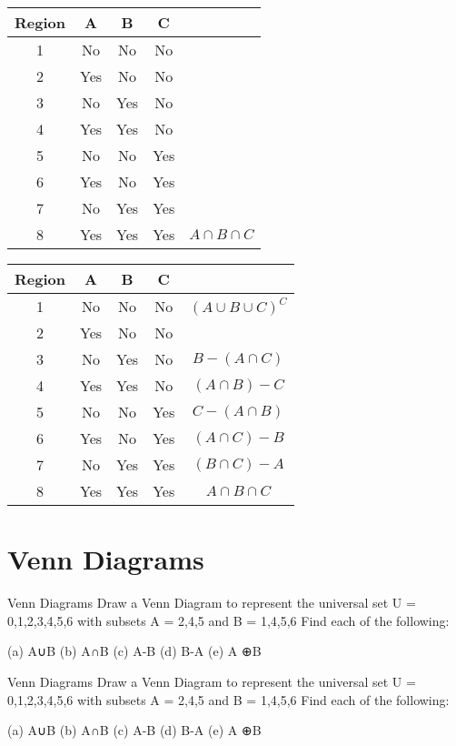 \begin{center}
	\begin{tabular}{|c|c|c|c|c|}
		\hline Region & A & B & C &  \\ 
		\hline 1 &\phantom{sp} No \phantom{sp}&\phantom{sp} No\phantom{sp} & \phantom{sp} No \phantom{sp} &  \\ 
		\hline 2 & Yes & No & No &  \\ 
		\hline 3 & No & Yes & No &  \\ 
		\hline 4 & Yes & Yes & No &  \\ 
		\hline 5 & No & No & Yes &  \\ 
		\hline 6 & Yes & No & Yes &  \\ 
		\hline 7 & No & Yes & Yes &  \\ 
		\hline 8 & Yes & Yes & Yes & $A \cap B \cap C$ \\ 
		\hline 
	\end{tabular}
\end{center} 

\begin{center}
	\begin{tabular}{|c|c|c|c|c|}
		\hline Region & A & B & C &  \\ 
		\hline 1 &\phantom{s} No \phantom{s}&\phantom{s} No\phantom{s} & \phantom{s} No \phantom{s} & $(A \cup B \cup C)^C$  \\ 
		\hline 2 & Yes & No & No &  \\ 
		\hline 3 & No & Yes & No &  $B-(A \cap C)$\\ 
		\hline 4 & Yes & Yes & No & $(A \cap B) - C$ \\ 
		\hline 5 & No & No & Yes &  $C-(A \cap B)$ \\ 
		\hline 6 & Yes & No & Yes & $(A \cap C) - B$ \\ 
		\hline 7 & No & Yes & Yes & $(B \cap C) - A$ \\ 
		\hline 8 & Yes & Yes & Yes & $A \cap B \cap C$ \\ 
		\hline 
	\end{tabular}
\end{center} 

\section*{Venn Diagrams}

Venn Diagrams
Draw a Venn Diagram to represent the universal set U = {0,1,2,3,4,5,6} with subsets
A = {2,4,5} and  B = {1,4,5,6}
Find each of the following:
 
(a) A∪B
(b) A∩B
(c) A-B
(d) B-A
(e) A ⊕B
 
 
 Venn Diagrams
 Draw a Venn Diagram to represent the universal set U = {0,1,2,3,4,5,6} with subsets
 A = {2,4,5} and  B = {1,4,5,6}
 Find each of the following:
 
 (a) A∪B
 (b) A∩B
 (c) A-B
 (d) B-A
 (e) A ⊕B
